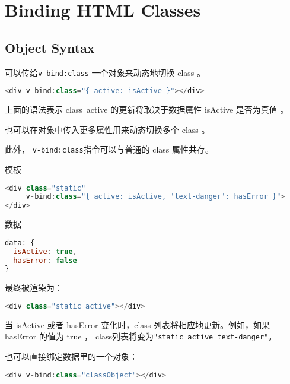 \section{Binding HTML Classes}



\subsection{Object Syntax}

可以传给\texttt{v-bind:class} 一个对象来动态地切换 class 。

\begin{lstlisting}[language=JavaScript]
<div v-bind:class="{ active: isActive }"></div>
\end{lstlisting}

上面的语法表示 class~active 的更新将取决于数据属性 isActive 是否为真值 。

也可以在对象中传入更多属性用来动态切换多个 class 。

此外， \texttt{v-bind:class}指令可以与普通的 class 属性共存。

\begin{compactitem}
\item 模板

\begin{lstlisting}[language=JavaScript]
<div class="static"
     v-bind:class="{ active: isActive, 'text-danger': hasError }">
</div>
\end{lstlisting}

\item 数据

\begin{lstlisting}[language=JavaScript]
data: {
  isActive: true,
  hasError: false
}
\end{lstlisting}
\end{compactitem}



最终被渲染为：


\begin{lstlisting}[language=JavaScript]
<div class="static active"></div>
\end{lstlisting}

当 isActive 或者 hasError 变化时，class 列表将相应地更新。例如，如果 hasError 的值为 true ， class列表将变为\texttt{"static active text-danger"}。

也可以直接绑定数据里的一个对象：

\begin{lstlisting}[language=JavaScript]
<div v-bind:class="classObject"></div>
\end{lstlisting}

